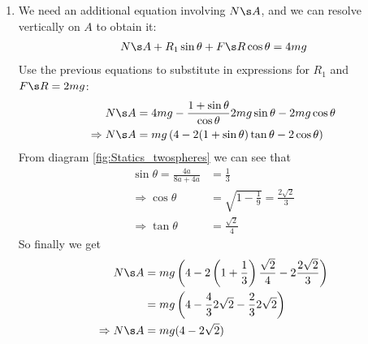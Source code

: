 \begin{problem} [A1988FMIIQ1a]
{\begin{enumerate}
Then the horizontal forces on $B$
\begin{align}
R_2\cos\theta=F\s R\sin\theta+F\s B \label{eq:Statics_twospheres3}
\end{align}
and finally the moments about the centre of B
\begin{align}
F\s R(4a)-F\s B(4a)&=0 \notag \\
\Rightarrow F\s R&=F\s B \label{eq:Statics_twospheres4}
\end{align}
This gives us the required four equations to solve for the four unknowns, $F\s A, F\s B, F\s R$ and $R$. Using the result from \eqref{eq:Statics_twospheres4} in \eqref{eq:Statics_twospheres3} we find
\begin{align}
R_2\cos\theta=F\s R\sin\theta&+F\s R \notag \\
\Rightarrow R_2&=\frac{1+\sin\theta}{\cos\theta}F\s R \label{eq:Statics_twospheres5}
\end{align}
and then using that result, an expression for $F\s R$ from \eqref{eq:Statics_twospheres2} and Newton's 3rd law to deduce $R_2=R_1$ we find:
\begin{align*}
2mg+F\s A+(2mg-F\s A)\sin\theta&=\frac{1+\sin\theta}{\cos\theta}(2mg-F\s A)\cos\theta \\ 
\Rightarrow 2mg+F\s A&=(2mg-F\s A)(1+\sin\theta-\sin\theta) \\
\Rightarrow 2mg+F\s A&=2mg-F\s A \\
\Rightarrow F\s A&=0
\end{align*}
\item
We need an additional equation involving $N\s A$, and we can resolve vertically on $A$ to obtain it:
\begin{align*}
N\s A+R_1\sin\theta+F\s R\cos\theta=4mg
\end{align*}
Use the previous equations to substitute in expressions for $R_1$ and $F\s R=2mg$:
\begin{align*}
N\s A&=4mg-\frac{1+\sin\theta}{\cos\theta}2mg\sin\theta-2mg\cos\theta \\
\Rightarrow N\s A&=mg\left(4-2(1+\sin\theta)\tan\theta-2\cos\theta\right) 
\end{align*}
From diagram \ref{fig:Statics_twospheres} we can see that 
\begin{align*}
\sin\theta=\frac{4a}{8a+4a}&=\frac{1}{3} \\
\Rightarrow \cos\theta&=\sqrt{1-\frac{1}{9}}=\frac{2\sqrt 2}{3} \\
\Rightarrow \tan\theta&=\frac{\sqrt{2}}{4} 
\end{align*}
So finally we get
\begin{align*}
N\s A&=mg\left(4-2\left(1+\frac{1}{3}\right)\frac{\sqrt{2}}{4}-2\frac{2\sqrt 2}{3}\right) \\
&=mg\left(4-\frac{4}{3}2\sqrt 2-\frac{2}{3}2\sqrt 2\right) \\
\Rightarrow N\s A&=mg(4-2\sqrt 2)
\end{align*}


\end{enumerate}}
\end{problem}
